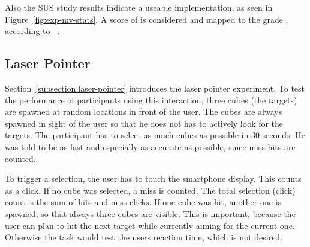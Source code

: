 Also the \ac{SUS} study results indicate a useable implementation, as seen in Figure~\ref{fig:exp-mv-stats}. A score of \evalExpMvSusScore{} is considered \evalExpMvSusAdj{} and mapped to the grade \evalExpMvSusGrade, according to \citeauthor{Bangor.2009}~\cite[120\psq]{Bangor.2009}.



\subsection{Laser Pointer}\label{section:eval-res-lp}

Section~\ref{subsection:laser-pointer} introduces the laser pointer experiment. To test the performance of participants using this interaction, three cubes (the targets) are spawned at random locations in front of the user. The cubes are always spawned in sight of the user so that he does not has to actively look for the targets. The participant has to select as much cubes as possible in 30 seconds. He was told to be as fast and especially as accurate as possible, since miss-hits are counted. 

To trigger a selection, the user has to touch the smartphone display. This counts as a click. If no cube was selected, a miss is counted. The total selection (click) count is the sum of hits and miss-clicks. If one cube was hit, another one is spawned, so that always three cubes are visible. This is important, because the user can plan to hit the next target while currently aiming for the current one. Otherwise the task would test the users reaction time, which is not desired. 

